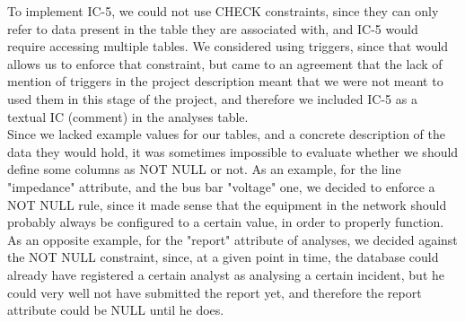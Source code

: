 \documentclass[titlepage]{article}
\numberwithin{equation}{section}
\numberwithin{figure}{section}
\numberwithin{table}{section}
\begin{document}
        To implement IC-5, we could not use CHECK constraints, since they can only refer to data present in the table they are associated with, and IC-5 would require accessing multiple tables.
        We considered using triggers, since that would allows us to enforce that constraint, but came to an agreement that the lack of mention of triggers in the project description meant that we were not meant to used them in this stage of the project, and therefore we included IC-5 as a textual IC (comment) in the analyses table.\\

        Since we lacked example values for our tables, and a concrete description of the data they would hold, it was sometimes impossible to evaluate whether we should define some columns as NOT NULL or not.
        As an example, for the line "impedance" attribute, and the bus bar "voltage" one, we decided to enforce a NOT NULL rule, since it made sense that the equipment in the network should probably always be configured to a certain value, in order to properly function.
        As an opposite example, for the "report" attribute of analyses, we decided against the NOT NULL constraint, since, at a given point in time, the database could already have registered a certain analyst as analysing a certain incident, but he could very well not have submitted the report yet, and therefore the report attribute could be NULL until he does.\\
\end{document}
